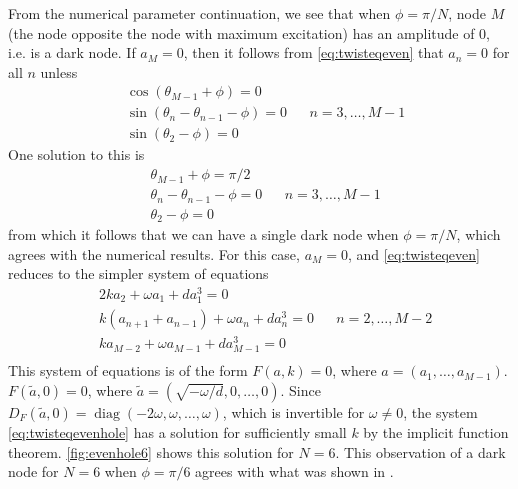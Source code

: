 \documentclass[12pt]{article}
\DeclareMathOperator{\diag}{diag}
\begin{document}
From the numerical parameter continuation, we see that when $\phi = \pi/N$, node $M$ (the node opposite the node with maximum excitation) has an amplitude of 0, i.e. is a dark node. If $a_M = 0$, then it follows from \cref{eq:twisteqeven} that $a_n = 0$ for all $n$ unless
\begin{equation}\label{eq:evendarknodecond}
\begin{aligned}
&\cos(\theta_{M-1} + \phi) = 0 \\
&\sin(\theta_{n} - \theta_{n-1} - \phi) = 0 && n = 3, \dots, M-1 \\
&\sin(\theta_2 - \phi) = 0
\end{aligned}
\end{equation}
One solution to this is
\begin{equation}\label{eq:evendarknodecond1}
\begin{aligned}
&\theta_{M-1} + \phi = \pi/2 \\
&\theta_{n} - \theta_{n-1} - \phi = 0 && n = 3, \dots, M-1 \\
&\theta_2 - \phi = 0
\end{aligned}
\end{equation}
from which it follows that we can have a single dark node when $\phi = \pi/N$, which agrees with the numerical results. For this case, $a_M = 0$, and \cref{eq:twisteqeven} reduces to the simpler system of equations
\begin{equation}\label{eq:twisteqevenhole}
\begin{aligned}
&2 k a_2 + \omega a_1 + d a_1^3 = 0 \\
&k\left( a_{n+1} + a_{n-1} \right) + \omega a_n + d a_n^3 = 0 && n = 2, \dots, M-2 \\
&k a_{M-2} + \omega a_{M-1} + d a_{M-1}^3 = 0 \\
\end{aligned}
\end{equation}
This system of equations is of the form $F(a,k) = 0$, where $a = (a_1, \dots, a_{M-1})$. $F(\tilde{a}, 0) = 0$, where $\tilde{a} = (\sqrt{-\omega/d}, 0, \dots, 0)$. Since $D_F(\tilde{a}, 0) = \diag(-2\omega,\omega, \dots, \omega)$, which is invertible for $\omega \neq 0$, the system \cref{eq:twisteqevenhole} has a solution for sufficiently small $k$ by the implicit function theorem. \cref{fig:evenhole6} shows this solution for $N=6$. This observation of a dark node for $N = 6$ when $\phi = \pi/6$ agrees with what was shown in \cite{castro2016}.
\end{document}
